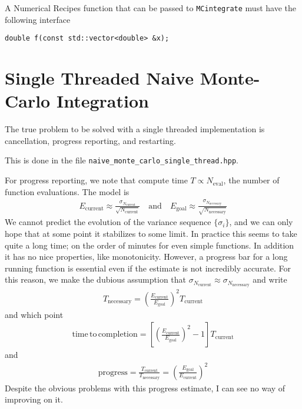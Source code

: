 \documentclass[landscape]{article}
\numberwithin{equation}{section}
\begin{document}
A Numerical Recipes function that can be passed to \texttt{MCintegrate} must have the following interface
\begin{verbatim}
double f(const std::vector<double> &x);
\end{verbatim}


\section{Single Threaded Naive Monte-Carlo Integration}


The true problem to be solved with a single threaded implementation is cancellation, progress reporting, and restarting.

This is done in the file \texttt{naive\_monte\_carlo\_single\_thread.hpp}.

For progress reporting, we note that compute time $T \propto N_{\mathrm{eval}}$, the number of function evaluations.
The model is
\begin{align*}
E_{\mathrm{current}} \approx \frac{\sigma_{N_{\mathrm{current}}}}{\sqrt{N_{\mathrm{current}}}}
\quad \mathrm{and} \quad
E_{\mathrm{goal}} \approx \frac{\sigma_{N_{\mathrm{necessary}}}}{\sqrt{N_{\mathrm{necessary}}}}
\end{align*}
We cannot predict the evolution of the variance sequence $\{\sigma_{i}\}$, and we can only hope that at some point it stabilizes to some limit.
In practice this seems to take quite a long time; on the order of minutes for even simple functions.
In addition it has no nice properties, like monotonicity.
However, a progress bar for a long running function is essential even if the estimate is not incredibly accurate.
For this reason, we make the dubious assumption that $\sigma_{N_{\mathrm{current}}} \approx \sigma_{N_{\mathrm{necessary}}}$ and write
\begin{align*}
T_{\mathrm{necessary}} = \left( \frac{E_{\mathrm{current}}}{E_{\mathrm{goal}}} \right)^{2}T_{\mathrm{current}}
\end{align*}
and which point
\begin{align*}
\mathrm{time\, to\, completion } = \left[\left( \frac{E_{\mathrm{current}}}{E_{\mathrm{goal}}} \right)^{2} -1 \right]T_{\mathrm{current}}
\end{align*}
and
\begin{align*}
\mathrm{progress} = \frac{T_{\mathrm{current}}}{T_{\mathrm{necessary}}} = \left( \frac{E_{\mathrm{goal}}}{E_{\mathrm{current}}} \right)^{2}
\end{align*}
Despite the obvious problems with this progress estimate, I can see no way of improving on it.
\end{document}
